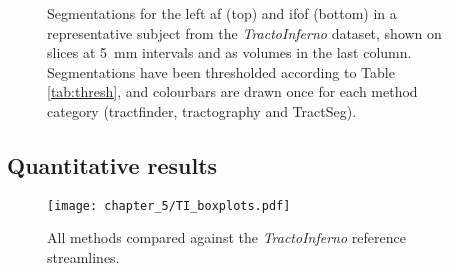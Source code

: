\begin{figure}[htb!]
  \begin{subfigure}{\textwidth}
    \makebox[\linewidth][r]{%
    }
  \end{subfigure}
  \begin{subfigure}{\textwidth}
    \makebox[\linewidth][r]{%
    }
  \end{subfigure}
  \caption{Segmentations for the left \gls{af} (top) and \gls{ifof} (bottom) in a representative subject from the \textit{TractoInferno} dataset, shown on slices at 5~mm intervals and as volumes in the last column. Segmentations have been thresholded according to Table \ref{tab:thresh}, and colourbars are drawn once for each method category (tractfinder, tractography and TractSeg).}
  \label{fig:lb.afifof}
\end{figure}
\begin{figure}[htb!]
  \centering
  \begin{subfigure}{\textwidth}
    \makebox[\linewidth][r]{%
    }
  \end{subfigure}
  \begin{subfigure}{\textwidth}
    \makebox[\linewidth][r]{%
    }
  \end{subfigure}
\end{figure}
\clearpage %
{
}
\subsection{Quantitative results}\label{sec:quant}

\begin{figure}[h!]
  \centering
  \texttt{[image: chapter\_5/TI\_boxplots.pdf]}
  \caption{All methods compared against the \textit{TractoInferno} reference streamlines. }
  \label{fig:combobox}
\end{figure}

